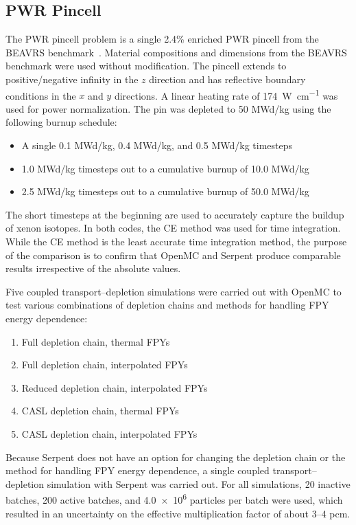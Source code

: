 \documentclass[3p,authoryear]{elsarticle}
\begin{document}
\subsection{PWR Pincell}

The PWR pincell problem is a single 2.4\% enriched PWR pincell from the BEAVRS
benchmark~\citep{horelik2013mc,horelik2018mit}. Material compositions and
dimensions from the BEAVRS benchmark were used without modification. The pincell
extends to positive/negative infinity in the $z$ direction and has reflective
boundary conditions in the $x$ and $y$ directions. A linear heating rate of
\SI{174}{\watt\per\centi\meter} was used for power normalization. The pin was
depleted to 50 MWd/kg using the following burnup schedule:
\begin{itemize}
  \item A single 0.1 MWd/kg, 0.4 MWd/kg, and 0.5 MWd/kg timesteps
  \item 1.0 MWd/kg timesteps out to a cumulative burnup of 10.0 MWd/kg
  \item 2.5 MWd/kg timesteps out to a cumulative burnup of 50.0 MWd/kg
\end{itemize}
The short timesteps at the beginning are used to accurately capture the buildup
of xenon isotopes. In both codes, the CE method was used for time
integration. While the CE method is the least accurate time integration
method, the purpose of the comparison is to confirm that OpenMC and Serpent
produce comparable results irrespective of the absolute values.

Five coupled transport--depletion simulations were carried out with OpenMC to test
various combinations of depletion chains and methods for handling FPY
energy dependence:
\begin{enumerate}
  \item Full depletion chain, thermal FPYs
  \item Full depletion chain, interpolated FPYs
  \item Reduced depletion chain, interpolated FPYs
  \item CASL depletion chain, thermal FPYs
  \item CASL depletion chain, interpolated FPYs
\end{enumerate}
Because Serpent does not have an option for changing the depletion chain or the
method for handling FPY energy dependence, a single coupled transport--depletion
simulation with Serpent was carried out. For all simulations, 20 inactive
batches, 200 active batches, and \num{4.0e6} particles per batch were used,
which resulted in an uncertainty on the effective multiplication factor of about
3--4 pcm.
\end{document}
